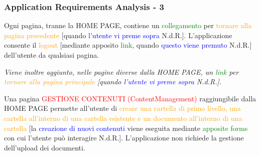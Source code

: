 \documentclass[aspectratio=169]{beamer}
\begin{document}
\begin{frame}
    \frametitle{Application Requirements Analysis - 3}
    Ogni pagina, tranne la HOME PAGE, contiene un \textcolor{Green}{collegamento} per
    \textcolor{Orange}{tornare alla pagina precedente} [quando \textcolor{Blue}{l'utente vi preme sopra} N.d.R.].
    L’applicazione consente il \textcolor{Orange}{logout} [mediante apposito \textcolor{Green}{link}, quando
        \textcolor{Blue}{questo viene premuto} N.d.R.] dell’utente da qualsiasi pagina. \newline

    \textit{Viene inoltre aggiunto, nelle pagine diverse dalla HOME PAGE, un \textcolor{Green}{link} per
        \textcolor{Orange}{tornare alla pagina principale} [quando \textcolor{Blue}{l'utente vi preme sopra} N.d.R.].}
    \newline

    Una pagina \textcolor{Red}{GESTIONE CONTENUTI (ContentManagement)} raggiungibile dalla HOME PAGE permette
    all’utente di \textcolor{Orange}{creare una cartella di primo livello, una cartella all’interno di una cartella
        esistente e un documento all’interno di una cartella} [la \textcolor{Blue}{creazione di nuovi contenuti} viene
        eseguita mediante \textcolor{Green}{apposite forms} con cui l'utente può interagire N.d.R.]. L’applicazione non
    richiede la gestione dell’upload dei documenti.\footnotemark{}

\end{frame}
\end{document}
